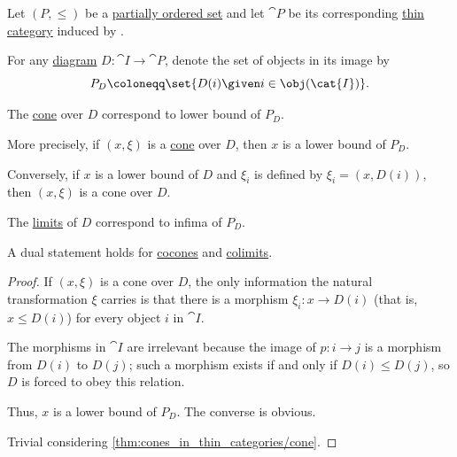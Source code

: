 \begin{proposition}\label{thm:cones_in_thin_categories}
  Let \( (P, \leq) \) be a \hyperref[def:partially_ordered_set]{partially ordered set} and let \( \cat{P} \) be its corresponding \hyperref[def:thin_category]{thin category} induced by .

  For any \hyperref[def:categorical_diagram]{diagram} \( D: \cat{I} \to \cat{P} \), denote the set of objects in its image by
  \begin{equation*}
    P_D \coloneqq \set{ D(i) \given i \in \obj(\cat{I}) }.
  \end{equation*}

  \begin{thmenum}
     The \hyperref[def:category_of_cones/objects]{cone} over \( D \) correspond to lower bound of \( P_D \).

    More precisely, if \( (x, \xi) \) is a \hyperref[def:category_of_cones/objects]{cone} over \( D \), then \( x \) is a lower bound of \( P_D \).

    Conversely, if \( x \) is a lower bound of \( D \) and \( \xi_i \) is defined by \( \xi_i = (x, D(i)) \), then \( (x, \xi) \) is a cone over \( D \).

     The \hyperref[def:categorical_limit]{limits} of \( D \) correspond to infima of \( P_D \).
  \end{thmenum}
\end{proposition}
\begin{comments}
  \item A dual statement holds for \hyperref[def:category_of_cocones/objects]{cocones} and \hyperref[def:categorical_colimit]{colimits}.
\end{comments}
\begin{proof}
   If \( (x, \xi) \) is a cone over \( D \), the only information the natural transformation \( \xi \) carries is that there is a morphism \( \xi_i: x \to D(i) \) (that is, \( x \leq D(i) \)) for every object \( i \) in \( \cat{I} \).

  The morphisms in \( \cat{I} \) are irrelevant because the image of \( p: i \to j \) is a morphism from \( D(i) \) to \( D(j) \); such a morphism exists if and only if \( D(i) \leq D(j) \), so \( D \) is forced to obey this relation.

  Thus, \( x \) is a lower bound of \( P_D \). The converse is obvious.

   Trivial considering \cref{thm:cones_in_thin_categories/cone}.
\end{proof}

